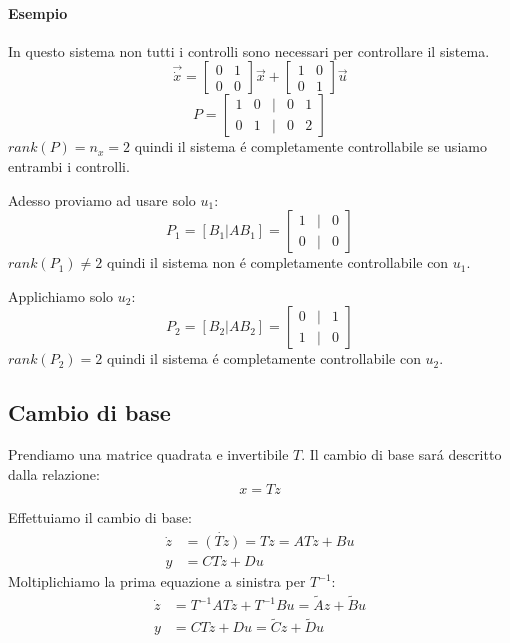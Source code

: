 \documentclass[../main.tex]{subfiles}
\begin{document}
		\begin{mdframed}[style=Esempio]
			\paragraph{Esempio}
			In questo sistema non tutti i controlli sono necessari per controllare il sistema.
			\[
				\vec{\dot x} =
				\begin{bmatrix}
					0 & 1\\
					0 & 0
				\end{bmatrix} \vec x +
				\begin{bmatrix}
				1 & 0\\
				0 & 1
				\end{bmatrix} \vec u 
			\]
			\[
				P =
				\begin{bmatrix}
					1 & 0 & | & 0 & 1\\
					0 & 1 & | & 0 & 2
				\end{bmatrix}
			\]
			$ rank\left( P \right) = n_x = 2 $ quindi il sistema \'e completamente controllabile se usiamo entrambi i controlli.
			
			Adesso proviamo ad usare solo $ u_1 $:
			\[
				P_1  = \left[ B_1 | AB_1 \right] =
				\begin{bmatrix}
					1 & | & 0\\
					0 & | & 0
				\end{bmatrix}
			\]
			$ rank\left( P_1 \right) \neq 2 $ quindi il sistema non \'e completamente controllabile con $ u_1 $.
			
			Applichiamo solo $ u_2 $:
			\[
			P_2  = \left[ B_2 | AB_2 \right] =
				\begin{bmatrix}
					0 & | & 1\\
					1 & | & 0
				\end{bmatrix}
			\]
			$ rank\left( P_2 \right) = 2 $ quindi il sistema \'e completamente controllabile con $ u_2 $.
		\end{mdframed}
		
	\subsection{Cambio di base}
		Prendiamo una matrice quadrata e invertibile $ T $. Il cambio di base sar\'a descritto dalla relazione:
		\[ 
			x = Tz
		\]
		
		Effettuiamo il cambio di base:
		\begin{align*}
			\dot z &= \dot{(Tz)} = T \dot z = ATz + Bu
			\\
			y &= CTz + Du
		\end{align*}
		Moltiplichiamo la prima equazione a sinistra per $ T^{-1} $:
		\begin{align}
			\dot z &= T^{-1}ATz + T^{-1}Bu = \tilde A z + \tilde B u
			\\
			y &= CTz + Du = \tilde C z + \tilde D u
		\end{align}
		
\end{document}
